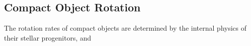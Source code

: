 {\color{orange}

\subsection{Compact Object Rotation}

The rotation rates of compact objects are determined by the internal physics of their stellar progenitors, and 

}